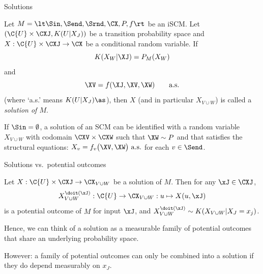 \begin{frame}{Solutions}
\begin{Def}[\ref{def:scm_solutions}]
  Let $M = \lt \Sin, \Send, \Srnd, \CX, P, f \rt$ be an iSCM.
  Let $(\C{U} \times \CXJ, K(U|X_J))$ be a transition probability space and $X : \C{U} \times \CXJ \to \CX$ be a conditional random variable.
  If 
  $$K(X_W | \XJ) = P_M(X_W)$$
  and
    \begin{equation}
      \XV = f(\XJ, \XV, \XW) \qquad \text{a.s.}
    \end{equation}
  (where `a.s.' means $K(U|X_J)\as$), then $X$ (and in particular $X_{V\cup W}$) is called a \emph{solution of $M$}.
\end{Def}
\begin{Rem}[\ref{rem:scm_no_inputs_solutions}]
  If $\Sin = \emptyset$, a solution of an SCM can be identified with a random variable 
  $X_{V \cup W}$ with codomain $\CXV \times \CXW$ such that $\XW \sim P$ and that
  satisfies the structural equations: $X_v = f_v\big(\XV, \XW\big) \text{ a.s.}$
  for each $v \in \Send$.
\end{Rem}
\end{frame}

\begin{frame}{Solutions vs.\ potential outcomes}
\begin{Rem}[\ref{def:scm_potential_outcome}]
  Let $X : \C{U} \times \CXJ \to \CX_{V\cup W}$ be a solution of $M$. 
  Then for any $\xJ \in \CXJ$, 
  $$X^{\doit(\xJ)}_{V\cup W} : \C{U} \to \CX_{V\cup W} : u \mapsto X(u,\xJ)$$ 
  is a potential outcome of $M$ for input $\xJ$,
  and $X^{\doit(\xJ)}_{V\cup W} \sim K(X_{V\cup W}|X_J=x_j)$.
\end{Rem}

  \medskip
Hence, we can think of a solution as a measurable family of potential outcomes that share an underlying probability space.

\medskip
However: a family of potential outcomes can only be combined into a solution if they do depend measurably on $x_J$.
\end{frame}

